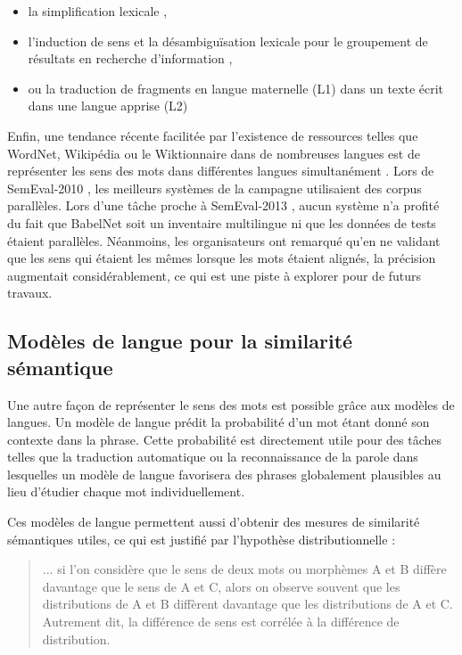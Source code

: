 \begin{itemize}
    \item la simplification lexicale
        \citep{specia2012semeval1,fabre2014presentation},
    \item l'induction de sens et la désambiguïsation lexicale pour le
        groupement de résultats en recherche d'information
        \citep{navigli2013semeval11},
    \item ou la traduction de fragments en langue maternelle (L1) dans un texte
        écrit dans une langue apprise (L2) \citep{vangompel2014semeval5}
\end{itemize}

Enfin, une tendance récente facilitée par l'existence de ressources telles que
WordNet, Wikipédia ou le Wiktionnaire dans de nombreuses langues est de
représenter les sens des mots dans différentes langues simultanément
\citep{navigli2013babelnet}. Lors de SemEval-2010 \citep{lefever2010semeval3},
les meilleurs systèmes de la campagne utilisaient des corpus parallèles. Lors
d'une tâche proche à SemEval-2013 \citep{navigli2013semeval12}, aucun système
n'a profité du fait que BabelNet soit un inventaire multilingue ni que les
données de tests étaient parallèles. Néanmoins, les organisateurs ont remarqué
qu'en ne validant que les sens qui étaient les mêmes lorsque les mots étaient
alignés, la précision augmentait considérablement, ce qui est une piste à
explorer pour de futurs travaux.

\subsection{Modèles de langue pour la similarité sémantique}
\label{subsec:modeles_de_langue}

Une autre façon de représenter le sens des mots est possible grâce aux modèles
de langues. Un modèle de langue prédit la probabilité d'un mot étant donné son
contexte dans la phrase. Cette probabilité est directement utile pour des
tâches telles que la traduction automatique ou la reconnaissance de la parole
dans lesquelles un modèle de langue favorisera des phrases globalement
plausibles au lieu d'étudier chaque mot individuellement.

Ces modèles de langue permettent aussi d'obtenir des mesures de similarité
sémantiques utiles, ce qui est justifié par l'hypothèse distributionnelle
\cite[p.~156]{harris1954distributional} :

\begin{quote} ... si l'on considère que le sens de deux mots ou morphèmes A et B
    diffère davantage que le sens de A et C, alors on observe souvent que les
    distributions de A et B diffèrent davantage que les distributions de A et C.
    Autrement dit, la différence de sens est corrélée à la différence de
    distribution. \end{quote}

